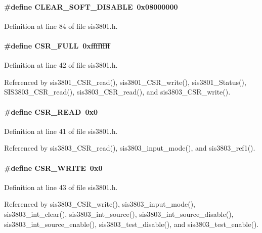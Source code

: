 \paragraph[{CLEAR\_\-SOFT\_\-DISABLE}]{\setlength{\rightskip}{0pt plus 5cm}\#define CLEAR\_\-SOFT\_\-DISABLE~0x08000000}\hfill\label{sis3801_8h_ab79425bb159d5ffb2ac6d9e7d1c3d9c7}


Definition at line 84 of file sis3801.h.
\paragraph[{CSR\_\-FULL}]{\setlength{\rightskip}{0pt plus 5cm}\#define CSR\_\-FULL~0xffffffff}\hfill\label{sis3801_8h_a817f0622ca0dd2c486abb98b68e91b17}


Definition at line 42 of file sis3801.h.

Referenced by sis3801\_\-CSR\_\-read(), sis3801\_\-CSR\_\-write(), sis3801\_\-Status(), SIS3803\_\-CSR\_\-read(), sis3803\_\-CSR\_\-read(), and sis3803\_\-CSR\_\-write().
\paragraph[{CSR\_\-READ}]{\setlength{\rightskip}{0pt plus 5cm}\#define CSR\_\-READ~0x0}\hfill\label{sis3801_8h_a5d574c1c714c8ad2807837164e500dac}


Definition at line 41 of file sis3801.h.

Referenced by sis3803\_\-CSR\_\-read(), sis3803\_\-input\_\-mode(), and sis3803\_\-ref1().
\paragraph[{CSR\_\-WRITE}]{\setlength{\rightskip}{0pt plus 5cm}\#define CSR\_\-WRITE~0x0}\hfill\label{sis3801_8h_afeec89b29b3e434512c8233711f834c3}


Definition at line 43 of file sis3801.h.

Referenced by sis3803\_\-CSR\_\-write(), sis3803\_\-input\_\-mode(), sis3803\_\-int\_\-clear(), sis3803\_\-int\_\-source(), sis3803\_\-int\_\-source\_\-disable(), sis3803\_\-int\_\-source\_\-enable(), sis3803\_\-test\_\-disable(), and sis3803\_\-test\_\-enable().
